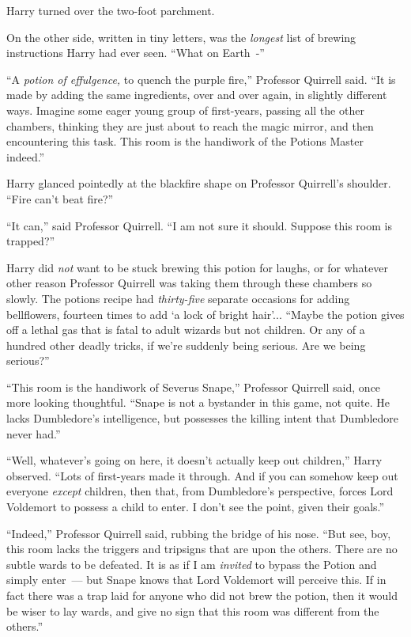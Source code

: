 Harry turned over the two-foot parchment.

On the other side, written in tiny letters, was the \emph{longest} list of brewing instructions Harry had ever seen. ``What on Earth~-''

``A \emph{potion of effulgence,} to quench the purple fire,'' Professor Quirrell said. ``It is made by adding the same ingredients, over and over again, in slightly different ways. Imagine some eager young group of first-years, passing all the other chambers, thinking they are just about to reach the magic mirror, and then encountering this task. This room is the handiwork of the Potions Master indeed.''

Harry glanced pointedly at the blackfire shape on Professor Quirrell's shoulder. ``Fire can't beat fire?''

``It can,'' said Professor Quirrell. ``I am not sure it should. Suppose this room is trapped?''

Harry did \emph{not} want to be stuck brewing this potion for laughs, or for whatever other reason Professor Quirrell was taking them through these chambers so slowly. The potions recipe had \emph{thirty-five} separate occasions for adding bellflowers, fourteen times to add `a lock of bright hair'... ``Maybe the potion gives off a lethal gas that is fatal to adult wizards but not children. Or any of a hundred other deadly tricks, if we're suddenly being serious. Are we being serious?''

``This room is the handiwork of Severus Snape,'' Professor Quirrell said, once more looking thoughtful. ``Snape is not a bystander in this game, not quite. He lacks Dumbledore's intelligence, but possesses the killing intent that Dumbledore never had.''

``Well, whatever's going on here, it doesn't actually keep out children,'' Harry observed. ``Lots of first-years made it through. And if you can somehow keep out everyone \emph{except} children, then that, from Dumbledore's perspective, forces Lord Voldemort to possess a child to enter. I don't see the point, given their goals.''

``Indeed,'' Professor Quirrell said, rubbing the bridge of his nose. ``But see, boy, this room lacks the triggers and tripsigns that are upon the others. There are no subtle wards to be defeated. It is as if I am \emph{invited} to bypass the Potion and simply enter~--- but Snape knows that Lord Voldemort will perceive this. If in fact there was a trap laid for anyone who did not brew the potion, then it would be wiser to lay wards, and give no sign that this room was different from the others.''

